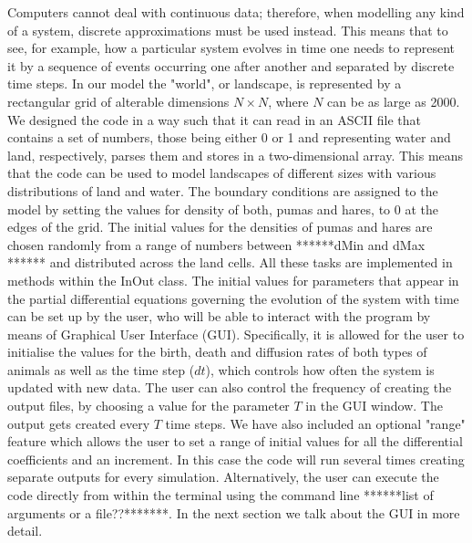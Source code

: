 \documentclass[11pt]{report}
\begin{document}
      Computers cannot deal with continuous data; therefore, when modelling any kind of a system, discrete approximations must be used instead. This means that to see, for example, how a particular system evolves in time one needs to represent it by a sequence of events occurring one after another and separated by discrete time steps. 
      \newline{}
      In our model the "world", or landscape, is represented by a rectangular grid of alterable dimensions $N \times N$, where $N$ can be as large as 2000.
      We designed the code in a way such that it can read in an ASCII file that contains a set of numbers, those being either 0 or 1 and representing water and land, respectively, parses them and stores in a two-dimensional array. This means that the code can be used to model landscapes of different sizes with various distributions of land and water.
      \newline{}
      The boundary conditions are assigned to the model by setting the values for density of both, pumas and hares, to 0 at the edges of the grid.      
      \newline{}
      The initial values for the densities of pumas and hares are chosen randomly from a range of numbers between ******dMin and dMax ****** and distributed across the land cells. All these tasks are implemented in methods within the InOut class.
      The initial values for parameters that appear in the partial differential equations governing the evolution of the system with time can be set up by the user, who will be able to interact with the program by means of Graphical User Interface (GUI). Specifically, it is allowed for the user to initialise the values for the birth, death and diffusion rates of both types of animals as well as the time step ($dt$), which controls how often the system is updated with new data.  The user can also control the frequency of creating the output files, by choosing a value for the parameter $T$ in the GUI window. The output gets created every $T$ time steps. We have also included an optional "range" feature which allows the user to set a range of initial values for all the differential coefficients and an increment. In this case the code will run several times creating separate outputs for every simulation. 
      \newline{}
      Alternatively, the user can execute the code directly from within the terminal using the command line ******list of arguments or a file??*******. In the next section we talk about the GUI in more detail. 
      \newline{}
      \newline{}
      
\end{document}
